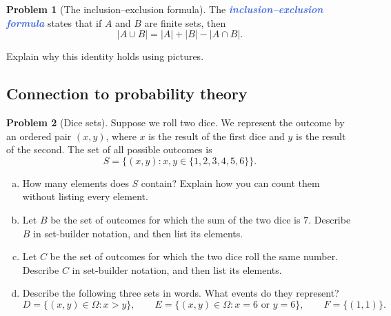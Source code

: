 \documentclass[10pt]{amsart}
\theoremstyle{definition}
\newtheorem{problem}{Problem}
\newcommand{\demph}[1]{\textcolor{RoyalBlue}{\textbf{\textit{#1}}}}
\begin{document}
\begin{problem}[The inclusion--exclusion formula]
  The \demph{inclusion--exclusion formula} states that if $A$ and $B$ are
  finite sets, then
  \begin{equation*}
    |A\cup B|=|A|+|B|-|A\cap B|.
  \end{equation*}

  Explain why this identity holds using pictures.

  \vspace{3in}
\end{problem}

\subsection{Connection to probability theory}

\begin{problem}[Dice sets]
  Suppose we roll two dice. We represent the outcome by an ordered pair
  $(x,y)$, where $x$ is the result of the first dice and $y$ is the result of
  the second. The set of all possible outcomes is
  \begin{equation*}
    S=\{(x,y):x,y\in\{1,2,3,4,5,6\}\}.
  \end{equation*}

  \begin{enumerate}[(a)]
    \item How many elements does $S$ contain? Explain how you can count
    them without listing every element.
    \vspace{.9in}

    \item Let $B$ be the set of outcomes for which the sum of the two dice is $7$.
    Describe $B$ in set-builder notation, and then list its elements.
    \vspace{.9in}

    \item Let $C$ be the set of outcomes for which the two dice roll the same
    number. Describe $C$ in set-builder notation, and then list its elements.
    \vspace{.9in}

    \item Describe the following three sets in words. What events do they represent?
    \begin{equation*}
      D=\{(x,y)\in\Omega:x>y\},
      \qquad
      E=\{(x,y)\in\Omega:x=6\text{ or }y=6\},
      \qquad
      F=\{(1,1)\}.
    \end{equation*}
    \vspace{1.3in}


\end{enumerate}
\end{problem}
\end{document}
